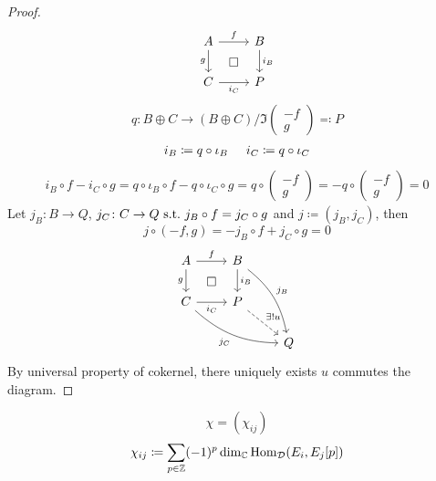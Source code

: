 \documentclass[leqno]{ltjsarticle}
\begin{document}
\begin{proof}
		\[
		\begin{tikzcd}
			A \ar[d,"g",swap]\ar[r,"f"]& B\ar[d,"i_B"]\\
			C\ar[r,"i_C",swap]& P\arrow[ul, phantom, "\Box"] 
		\end{tikzcd}
	\]
	\[q\colon B\oplus C\rightarrow (B\oplus C)/\Im\begin{pmatrix}-f\\ g\end{pmatrix}\eqcolon P\]
	\begin{gather*}
		i_B\coloneq q\circ \iota_{B}\hspace{5mm}i_C\coloneq q\circ\iota_{C}
	\end{gather*}
	\begin{align*}
		i_B\circ f - i_C\circ g = q\circ\iota_B\circ f - q\circ\iota_C\circ g = q\circ \begin{pmatrix}-f\\ g\end{pmatrix}= -q\circ \begin{pmatrix}-f\\ g\end{pmatrix}= 0
	\end{align*}
	 Let $j_B\colon B\rightarrow Q$, $j_C\colon C\rightarrow Q \ \mathrm{s.t.}\  j_B\circ f = j_C\circ g$ and $ j\coloneq (j_B,j_C)$, then 
	 \[j\circ (-f,g) = -j_B\circ f + j_C\circ g = 0\]
	 \[\begin{tikzcd}
		 A \ar[d,"g",swap] \ar[r,"f"] & B \ar[d,"i_B"] \ar[ddr, bend left=20, "j_B"] & \\
		 C \ar[r,"i_C",swap] \ar[drr, bend right=20, "j_C", swap] & P \ar[dr, dashed, "\exists !u", description] \arrow[ul, phantom, "\Box"] & \\
		 && Q
	 \end{tikzcd}
	\]
	By universal property of cokernel, there uniquely exists $u$ commutes the diagram.
\end{proof}
\[\chi = (\chi_{ij})\]
\begin{align*}
	\chi_{ij} \coloneq \sum_{p\in\mathbb Z}(-1)^p\dim_{\mathbb C}\operatorname{\mathrm{Hom}}_{\mathcal D}(E_i,E_j[p])
\end{align*}
\end{document}
